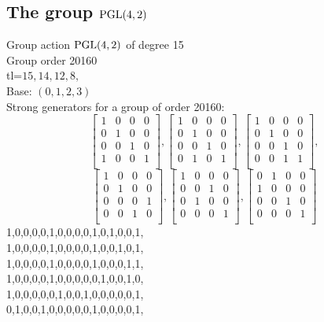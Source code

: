 \subsection{The group ${\rm PGL}(4,2)$}
Group action ${\rm PGL}(4,2)$ of degree 15\\
Group order 20160\\
tl=$15, 14, 12, 8, $\\
Base: $( 0, 1, 2, 3 )$\\
{\small\arraycolsep=2pt
Strong generators for a group of order 20160:
$$
\left[
\begin{array}{*{4}{r}}
1 & 0 & 0 & 0\\
0 & 1 & 0 & 0\\
0 & 0 & 1 & 0\\
1 & 0 & 0 & 1\\
\end{array}
\right]
, 
\left[
\begin{array}{*{4}{r}}
1 & 0 & 0 & 0\\
0 & 1 & 0 & 0\\
0 & 0 & 1 & 0\\
0 & 1 & 0 & 1\\
\end{array}
\right]
, 
\left[
\begin{array}{*{4}{r}}
1 & 0 & 0 & 0\\
0 & 1 & 0 & 0\\
0 & 0 & 1 & 0\\
0 & 0 & 1 & 1\\
\end{array}
\right]
, 
$$
$$
\left[
\begin{array}{*{4}{r}}
1 & 0 & 0 & 0\\
0 & 1 & 0 & 0\\
0 & 0 & 0 & 1\\
0 & 0 & 1 & 0\\
\end{array}
\right]
, 
\left[
\begin{array}{*{4}{r}}
1 & 0 & 0 & 0\\
0 & 0 & 1 & 0\\
0 & 1 & 0 & 0\\
0 & 0 & 0 & 1\\
\end{array}
\right]
, 
\left[
\begin{array}{*{4}{r}}
0 & 1 & 0 & 0\\
1 & 0 & 0 & 0\\
0 & 0 & 1 & 0\\
0 & 0 & 0 & 1\\
\end{array}
\right]
$$
1,0,0,0,0,1,0,0,0,0,1,0,1,0,0,1,\\
1,0,0,0,0,1,0,0,0,0,1,0,0,1,0,1,\\
1,0,0,0,0,1,0,0,0,0,1,0,0,0,1,1,\\
1,0,0,0,0,1,0,0,0,0,0,1,0,0,1,0,\\
1,0,0,0,0,0,1,0,0,1,0,0,0,0,0,1,\\
0,1,0,0,1,0,0,0,0,0,1,0,0,0,0,1,\\
}

